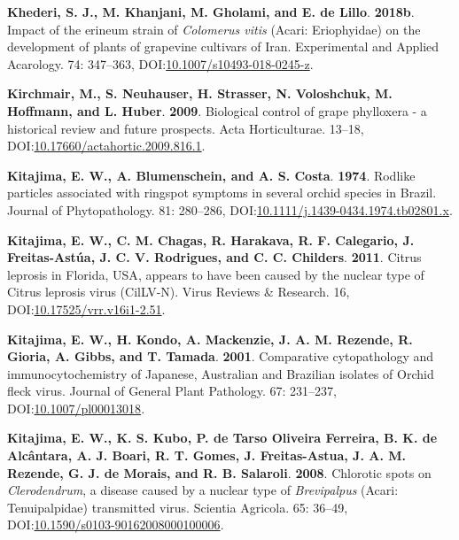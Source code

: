 \documentclass[12pt,final,CPage]{ufthesis}
\newlength{\cslhangindent}
\newenvironment{CSLReferences}[2] %
{%
	\setlength{\parindent}{0pt}
	\ifodd #1 \everypar{\setlength{\hangindent}{\cslhangindent}}\ignorespaces\fi
	\ifnum #2 > 0
	\setlength{\parskip}{#2\baselineskip}
	\fi
}%
{}
\begin{document}
{\begin{CSLReferences}{1}{0}
  \leavevmode{}%
  \textbf{Khederi, S. J., M. Khanjani, M. Gholami, and E. de Lillo}. \textbf{2018b}. Impact of the erineum strain of {\emph{Colomerus vitis}} ({Acari}: {Eriophyidae}) on the development of plants of grapevine cultivars of {Iran}. Experimental and Applied Acarology. 74: 347--363, DOI:\href{https://doi.org/10.1007/s10493-018-0245-z}{10.1007/s10493-018-0245-z}.

  \leavevmode{}%
  \textbf{Kirchmair, M., S. Neuhauser, H. Strasser, N. Voloshchuk, M. Hoffmann, and L. Huber}. \textbf{2009}. Biological control of grape phylloxera - a historical review and future prospects. Acta Horticulturae. 13--18, DOI:\href{https://doi.org/10.17660/actahortic.2009.816.1}{10.17660/actahortic.2009.816.1}.

  \leavevmode{}%
  \textbf{Kitajima, E. W., A. Blumenschein, and A. S. Costa}. \textbf{1974}. Rodlike particles associated with ringspot symptoms in several orchid species in {Brazil}. Journal of Phytopathology. 81: 280--286, DOI:\href{https://doi.org/10.1111/j.1439-0434.1974.tb02801.x}{10.1111/j.1439-0434.1974.tb02801.x}.

  \leavevmode{}%
  \textbf{Kitajima, E. W., C. M. Chagas, R. Harakava, R. F. Calegario, J. Freitas-Astúa, J. C. V. Rodrigues, and C. C. Childers}. \textbf{2011}. {Citrus leprosis} in {Florida}, {USA}, appears to have been caused by the nuclear type of {Citrus leprosis virus} ({CilLV-N}). Virus Reviews {\&} Research. 16, DOI:\href{https://doi.org/10.17525/vrr.v16i1-2.51}{10.17525/vrr.v16i1-2.51}.

  \leavevmode{}%
  \textbf{Kitajima, E. W., H. Kondo, A. Mackenzie, J. A. M. Rezende, R. Gioria, A. Gibbs, and T. Tamada}. \textbf{2001}. Comparative cytopathology and immunocytochemistry of {Japanese}, {Australian} and {Brazilian} isolates of {Orchid fleck virus}. Journal of General Plant Pathology. 67: 231--237, DOI:\href{https://doi.org/10.1007/pl00013018}{10.1007/pl00013018}.

  \leavevmode{}%
  \textbf{Kitajima, E. W., K. S. Kubo, P. de Tarso Oliveira Ferreira, B. K. de Alcântara, A. J. Boari, R. T. Gomes, J. Freitas-Astua, J. A. M. Rezende, G. J. de Morais, and R. B. Salaroli}. \textbf{2008}. Chlorotic spots on {\emph{Clerodendrum}}, a disease caused by a nuclear type of {\emph{Brevipalpus}} ({Acari}: {Tenuipalpidae}) transmitted virus. Scientia Agricola. 65: 36--49, DOI:\href{https://doi.org/10.1590/s0103-90162008000100006}{10.1590/s0103-90162008000100006}.


\end{CSLReferences}}
\end{document}
